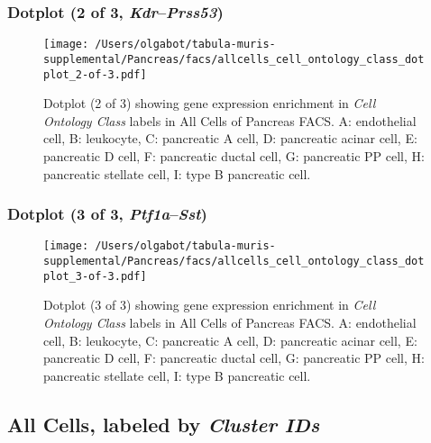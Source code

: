 \clearpage

\subsubsection{Dotplot (2 of 3, \emph{Kdr}--\emph{Prss53})}
\begin{figure}[h]
\centering
\texttt{[image: /Users/olgabot/tabula-muris-supplemental/Pancreas/facs/allcells\_cell\_ontology\_class\_dotplot\_2-of-3.pdf]}

\caption{ Dotplot (2 of 3)  showing gene expression enrichment in \emph{Cell Ontology Class} labels in All Cells of Pancreas FACS. A: endothelial cell, B: leukocyte, C: pancreatic A cell, D: pancreatic acinar cell, E: pancreatic D cell, F: pancreatic ductal cell, G: pancreatic PP cell, H: pancreatic stellate cell, I: type B pancreatic cell.}
\end{figure}


\clearpage

\subsubsection{Dotplot (3 of 3, \emph{Ptf1a}--\emph{Sst})}
\begin{figure}[h]
\centering
\texttt{[image: /Users/olgabot/tabula-muris-supplemental/Pancreas/facs/allcells\_cell\_ontology\_class\_dotplot\_3-of-3.pdf]}

\caption{ Dotplot (3 of 3)  showing gene expression enrichment in \emph{Cell Ontology Class} labels in All Cells of Pancreas FACS. A: endothelial cell, B: leukocyte, C: pancreatic A cell, D: pancreatic acinar cell, E: pancreatic D cell, F: pancreatic ductal cell, G: pancreatic PP cell, H: pancreatic stellate cell, I: type B pancreatic cell.}
\end{figure}


\clearpage

\subsection{All Cells, labeled by \emph{Cluster IDs}}
